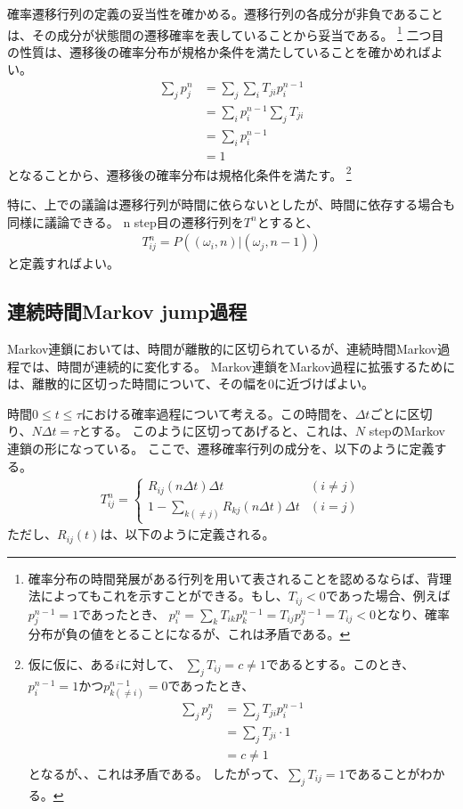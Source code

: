 \documentclass[a4paper,11pt]{jsarticle}
\numberwithin{equation}{section}
\begin{document}
確率遷移行列の定義の妥当性を確かめる。遷移行列の各成分が非負であることは、その成分が状態間の遷移確率を表していることから妥当である。
\footnote{
    確率分布の時間発展がある行列を用いて表されることを認めるならば、背理法によってもこれを示すことができる。もし、$T_{ij} < 0$であった場合、例えば$p_{j}^{n-1} = 1$であったとき、
    $p_{i}^{n} = \sum_{k} T_{ik} p_k^{n-1} = T_{ij}p_{j}^{n-1} = T_{ij} < 0$となり、確率分布が負の値をとることになるが、これは矛盾である。
}
二つ目の性質は、遷移後の確率分布が規格か条件を満たしていることを確かめればよい。
\begin{align}
    \sum_{j} p_{j}^{n} &= \sum_{j} \sum_{i} T_{ji} p_i^{n-1} \\
    &= \sum_{i} p_i^{n-1} \sum_{j} T_{ji} \\
    &= \sum_{i} p_i^{n-1} \\
    &= 1
\end{align}
となることから、遷移後の確率分布は規格化条件を満たす。
\footnote{
    仮に仮に、ある$i$に対して、
    $\sum_{j} T_{ij} =c \neq 1$であるとする。このとき、$p_{i}^{n-1} = 1$かつ$p_{k(\neq i)}^{n-1} = 0$であったとき、
    \begin{align}
        \sum_{j} p_{j}^{n} &= \sum_{j} T_{ji} p_i^{n-1} \\
        &= \sum_{j} T_{ji} \cdot 1 \\
        &= c \neq 1
    \end{align}
    となるが、、これは矛盾である。
    したがって、$\sum_{j} T_{ij} = 1$であることがわかる。
}

特に、上での議論は遷移行列が時間に依らないとしたが、時間に依存する場合も同様に議論できる。
n step目の遷移行列を$T^n$とすると、
\begin{align}
    T^n_{ij} = P((\omega_i,n) |(\omega_j,n-1))
\end{align}
と定義すればよい。

\subsection{連続時間Markov jump過程}
Markov連鎖においては、時間が離散的に区切られているが、連続時間Markov過程では、時間が連続的に変化する。
Markov連鎖をMarkov過程に拡張するためには、離散的に区切った時間について、その幅を0に近づけばよい。

時間$0 \leq t \leq \tau$における確率過程について考える。この時間を、$\Delta t$ごとに区切り、$N\Delta t = \tau$とする。
このように区切ってあげると、これは、$N$ stepのMarkov連鎖の形になっている。
ここで、遷移確率行列の成分を、以下のように定義する。
\begin{align}
    T_{ij}^{n} = 
    \begin{cases}
        R_{ij} (n\Delta t) \Delta t & (i \neq j) \\
        1 - \sum_{k (\neq j)} R_{kj} (n\Delta t) \Delta t & (i = j)
    \end{cases}
\end{align}
ただし、$R_{ij}(t)$は、以下のように定義される。
\end{document}
